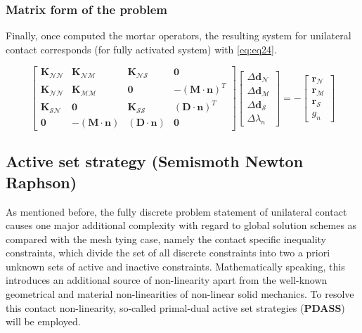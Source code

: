 \documentclass[a4paper,10pt]{article} %
\begin{document}
\subsubsection{Matrix form of the problem}


Finally, once computed the mortar operators, the resulting system for unilateral contact corresponds (for fully activated system) with \eqref{eq:eq24}.

\begin{equation}\label{eq:eq24}
 \left[ \begin{array}{cccc} \mathbf{K}_{\mathcal{N}\mathcal{N}} &  \mathbf{K}_{\mathcal{N}\mathcal{M}} & \mathbf{K}_{\mathcal{N}\mathcal{S}} & \mathbf{0} \\ \mathbf{K}_{\mathcal{N}\mathcal{N}}  & \mathbf{K}_{\mathcal{M}\mathcal{M}} & \mathbf{0} & -(\mathbf{M}\cdot \mathbf{n})^{T} \\ \mathbf{K}_{\mathcal{S}\mathcal{N}} & \mathbf{0} & \mathbf{K}_{\mathcal{S}\mathcal{S}} & (\mathbf{D}\cdot \mathbf{n})^T \\ \mathbf{0} & -(\mathbf{M}\cdot \mathbf{n}) & (\mathbf{D}\cdot \mathbf{n}) & \mathbf{0}   \end{array} \right] \left[ \begin{array}{c} \Delta\mathbf{d}_{\mathcal{N}} \\ \Delta\mathbf{d}_{\mathcal{M}} \\ \Delta\mathbf{d}_{\mathcal{S}} \\ \Delta\lambda_n \end{array} \right] = - \left[ \begin{array}{c} \mathbf{r}_{\mathcal{N}} \\ \mathbf{r}_{\mathcal{M}} \\ \mathbf{r}_{\mathcal{S}} \\ g_n \end{array} \right] 
\end{equation}

\subsection{Active set strategy (Semismoth Newton Raphson)}

As mentioned before, the fully discrete problem statement of unilateral contact causes one major additional complexity with regard to global solution schemes as compared with the mesh tying case, namely the contact specific inequality constraints, which divide the set of all discrete constraints into two a priori unknown sets of active and inactive constraints. Mathematically speaking, this introduces an additional source of non-linearity apart from the well-known geometrical and material non-linearities of non-linear solid mechanics. To resolve this contact non-linearity, so-called primal-dual active set strategies (\textbf{PDASS}) will be employed.
\end{document}
